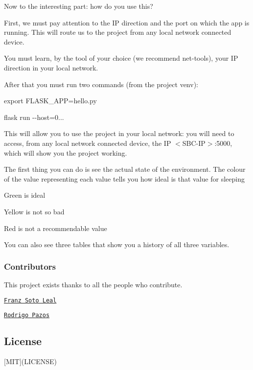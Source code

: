 Now to the interesting part\+: how do you use this?

First, we must pay attention to the IP direction and the port on which the app is running. This will route us to the project from any local network connected device.

You must learn, by the tool of your choice (we recommend net-\/tools), your IP direction in your local network.

After that you must run two commands (from the project venv)\+:

{\ttfamily export F\+L\+A\+S\+K\+\_\+\+A\+PP=hello.\+py}

{\ttfamily flask run -\/-\/host=0...}

This will allow you to use the project in your local network\+: you will need to access, from any local network connected device, the IP $<$S\+B\+C-\/\+IP$>$\+:5000, which will show you the project working.



The first thing you can do is see the actual state of the environment. The colour of the value representing each value tells you how ideal is that value for sleeping
\begin{DoxyItemize}
\item Green is ideal
\item Yellow is not so bad
\item Red is not a recommendable value
\end{DoxyItemize}

You can also see three tables that show you a history of all three variables.

\subsubsection*{Contributors}

This project exists thanks to all the people who contribute.
\begin{DoxyItemize}
\item \href{https://github.com/FranzSL}{\tt Franz Soto Leal}
\item \href{https://github.com/ropa1998}{\tt Rodrigo Pazos}
\end{DoxyItemize}

\subsection*{License}

\mbox{[}M\+IT\mbox{]}(L\+I\+C\+E\+N\+SE) 